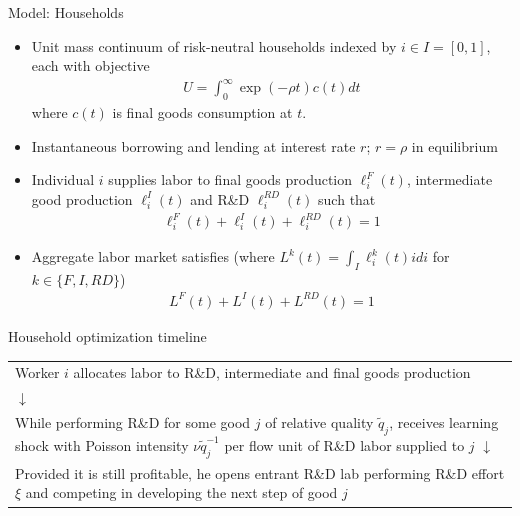 \documentclass[english,usenames,dvipsnames]{beamer}
\begin{document}
\begin{frame}{Model: Households}
\begin{itemize}
	\item Unit mass continuum of risk-neutral households indexed by $i\in I =[0,1]$, each with objective
	\begin{align*}
	U = \int_0^{\infty}\exp(-\rho t)c(t)dt
	\end{align*}
	where $c(t)$ is final goods consumption at $t$.
	\item Instantaneous borrowing and lending at interest rate $r$; $r = \rho$ in equilibrium
	\item Individual $i$ supplies labor to final goods production $\ell^F_i (t)$, intermediate good production $\ell^I_i (t)$ and R\&D $\ell_i^{RD} (t)$ such that 
	\begin{align*}
	\ell_i^F(t)+ \ell_i^I(t) + \ell_i^{RD}(t) = 1
	\end{align*}
	\item Aggregate labor market satisfies (where $L^k(t) = \int_I \ell_i^k(t) idi$ for $k\in\{F,I,RD\}$)
	\begin{align*}
	L^F(t) + L^I(t) + L^{RD}(t) = 1
	\end{align*}
\end{itemize}
\end{frame}

\begin{frame}{Household optimization timeline}
\begin{table}
\begin{tabular}{p{}}
	\centering
	Worker $i$ allocates labor to R\&D, intermediate and final goods production \\
	$\downarrow$\\
	While performing R\&D for some good $j$ of relative quality $\tilde{q}_j$, receives learning shock with Poisson intensity $\nu \tilde{q}_j^{-1}$ per flow unit of R\&D labor supplied to $j$
	$\downarrow$\\
	Provided it is still profitable, he opens entrant R\&D lab performing R\&D effort $\xi$ and competing in developing the next step of good $j$
\end{tabular}
\end{table}
\end{frame}
\end{document}
